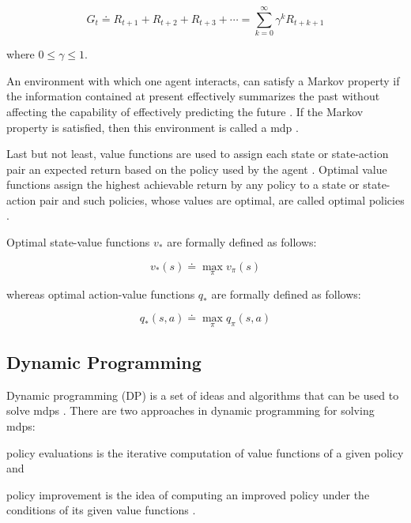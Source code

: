 \documentclass{seal_thesis}
\begin{document}
\begin{equation}
\label{eq:expected_discounted_return}
	G_t  \doteq R_{t+1} + R_{t+2} + R_{t+3} + \cdots = \sum_{k=0}^\infty \gamma^k R_{t+k+1}
\end{equation}

where $0 \leq \gamma \leq 1$.

An environment  with which one agent interacts, can satisfy a Markov property if the information contained at present effectively summarizes the past without affecting the capability of effectively predicting the future \cite[p. 73]{Sutton2017}. If the Markov property is satisfied, then this environment is called a \gls{mdp} \cite[p. 73]{Sutton2017}.

Last but not least, value functions are used to assign each state or state-action pair an expected return based on the policy used by the agent \cite[p. 74]{Sutton2017}. Optimal value functions assign the highest achievable return by any policy to a state or state-action pair  and such policies, whose values are optimal, are called optimal policies \cite[p. 74]{Sutton2017}.

Optimal state-value functions $v_*$ are formally defined as follows:

\begin{equation}
	v_* (s) \doteq \max_\pi v_\pi (s)
\end{equation}

whereas optimal action-value functions $q_*$ are formally defined as follows:

\begin{equation}
	q_* (s,a) \doteq \max_\pi q_\pi (s,a)
\end{equation}

\subsection{Dynamic Programming}
\label{subsec:dp}

Dynamic programming (DP) is a set of ideas and algorithms that can be used to solve \glspl{mdp} \cite[p. 95]{Sutton2017}. There are two approaches in dynamic programming for solving \glspl{mdp}:
\begin{enumerate*}
	\item policy evaluations is the iterative computation of value functions of a given policy and
	\item policy improvement is the idea of computing an improved policy under the conditions of its given value functions \cite[p. 95]{Sutton2017}.
\end{enumerate*}
\end{document}
